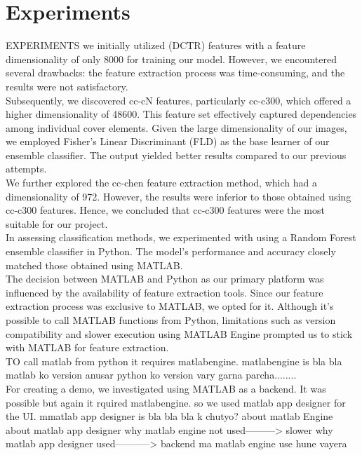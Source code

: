 \chapter{Experiments}
EXPERIMENTS 
we initially utilized (DCTR) features  with a feature dimensionality of only 8000 for training our model. However, we encountered several drawbacks: the feature extraction process was time-consuming, and the results were not satisfactory.\\

Subsequently, we discovered cc-cN features, particularly cc-c300, which offered a higher dimensionality of 48600. This feature set effectively captured dependencies among individual cover elements. Given the large dimensionality of our images, we employed Fisher's Linear Discriminant (FLD) as the base learner of our ensemble classifier. The output yielded better results compared to our previous attempts.\\

We further explored the cc-chen feature extraction method, which had a dimensionality of 972. However, the results were inferior to those obtained using cc-c300 features. Hence, we concluded that cc-c300 features were the most suitable for our project.\\

In assessing classification methods, we experimented with using a Random Forest ensemble classifier in Python. The model's performance and accuracy closely matched those obtained using MATLAB.\\

The decision between MATLAB and Python as our primary platform was influenced by the availability of feature extraction tools. Since our feature extraction process was exclusive to MATLAB, we opted for it. Although it's possible to call MATLAB functions from Python, limitations such as version compatibility and slower execution using MATLAB Engine prompted us to stick with MATLAB for feature extraction.\\
TO call matlab from python it requires matlabengine. matlabengine is bla bla matlab ko version anusar python ko version vary garna parcha........ \\

For creating a demo, we investigated using MATLAB as a backend. It was possible but again it rquired matlabengine. so we used matlab app designer for the UI. mmatlab app designer is bla bla bla
k chutyo?
about matlab Engine
about matlab app designer
why matlab engine not used---------> slower
why matlab app designer used-----------> backend ma matlab engine use hune vayera 